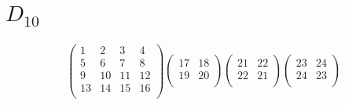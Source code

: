 \documentclass[12pt,a4paper]{amsart}
\begin{document}
\section*{$D_{10}$}
\begin{align*}
\left(\begin{array}{r|r|r|r}%
1&2&3&4\\%
\hline
5&6&7&8\\%
\hline
9&10&11&12\\%
\hline
13&14&15&16\\%
\end{array}\right)%
\left(\begin{array}{r|r}%
17&18\\%
\hline
19&20\\%
\end{array}\right)%
\left(\begin{array}{rr}%
21&22\\
22&21\\
\end{array}\right)%
\left(\begin{array}{rrr}%
23&24\\
24&23\\
\end{array}\right)%
\end{align*}
\end{document}
